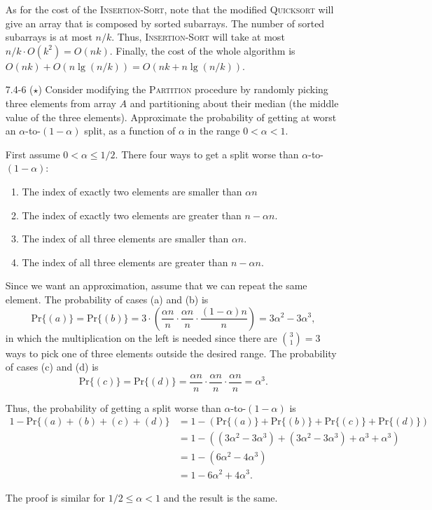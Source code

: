 \documentclass{report}
\makeatletter
\renewenvironment{framed}{%
 \def\FrameCommand##1{\hskip\@totalleftmargin
 \fboxsep=\FrameSep\fbox{##1}}%
 \MakeFramed {\advance\hsize-\width
   \@totalleftmargin\z@ \linewidth\hsize
   \@setminipage}}%
 {\par\unskip\endMakeFramed}
\makeatother
\begin{document}
\begin{enumerate}
\begin{framed}
As for the cost of the \textsc{Insertion-Sort}, note that the modified
\textsc{Quicksort} will give an array that is composed by sorted subarrays. The
number of sorted subarrays is at most $n/k$. Thus, \textsc{Insertion-Sort} will
take at most $n/k \cdot O(k^2) = O(nk)$. Finally, the cost of the whole
algorithm is $O(nk) + O(n \lg (n/k)) = O(nk + n \lg (n/k))$.

\end{framed}

\newpage

\item[7.4{-}6]{($\star$) Consider modifying the \textsc{Partition} procedure by
randomly picking three elements from array $A$ and partitioning about their
median (the middle value of the three elements). Approximate the probability of
getting at worst an $\alpha$-to-$(1 - \alpha)$ split, as a function of
$\alpha$ in the range $0 < \alpha < 1$.}

\begin{framed}
First assume $0 < \alpha \le 1/2$. There four ways to get a split worse than
$\alpha$-to-$(1 - \alpha)$:
\begin{enumerate}
  \item The index of exactly two elements are smaller than $\alpha n$
  \item The index of exactly two elements are greater than $n - \alpha n$.
  \item The index of all three elements are smaller than $\alpha n$.
  \item The index of all three elements are greater than $n - \alpha n$.
\end{enumerate}
Since we want an approximation, assume that we can repeat the same element. The
probability of cases (a) and (b) is
\[
  \text{Pr}\{(a)\} = \text{Pr}\{(b)\} =
  3 \cdot \left(\frac{\alpha n}{n} \cdot \frac{\alpha n}{n} \cdot
                \frac{(1 - \alpha) n}{n}\right) =
  3 \alpha^2 - 3 \alpha^3,
\]
in which the multiplication on the left is needed since there are
$\binom{3}{1} = 3$ ways to pick one of three elements outside the desired range.
The probability of cases (c) and (d) is
\[
  \text{Pr}\{(c)\} = \text{Pr}\{(d)\} =
  \frac{\alpha n}{n} \cdot \frac{\alpha n}{n} \cdot \frac{\alpha n}{n} =
  \alpha^3.
\]

Thus, the probability of getting a split worse than $\alpha$-to-$(1 - \alpha)$ is
\begin{equation*}
\begin{aligned}
  1 - \text{Pr}\{(a) + (b) + (c) + (d)\}
  &= 1 - \left(\text{Pr}\{(a)\} + \text{Pr}\{(b)\} + \text{Pr}\{(c)\} + \text{Pr}\{(d)\}\right)\\
  &= 1 - \left((3 \alpha^2 - 3 \alpha^3) + (3 \alpha^2 - 3 \alpha^3) + \alpha^3 + \alpha^3\right)\\
  &= 1 - (6 \alpha^2 - 4 \alpha^3)\\
  &= 1 - 6 \alpha^2 + 4 \alpha^3.
\end{aligned}
\end{equation*}

The proof is similar for $1/2 \le \alpha < 1$ and the result is the same.
\end{framed}

\end{enumerate}
\end{document}
